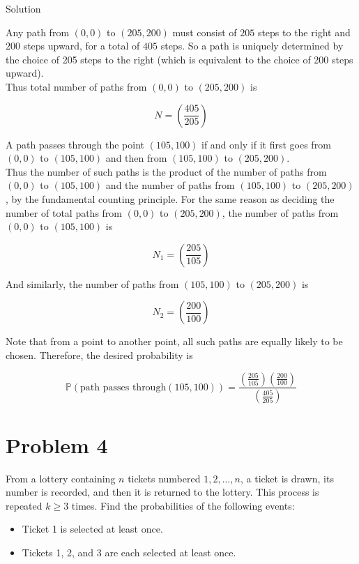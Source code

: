 \documentclass{qlnotes-export}
\begin{document}
\begin{qlsolution}{Solution}

Any path from \((0,0)\) to \((205,200)\) must consist of \(205\) steps to the right and \(200\) steps upward, for a total of \(405\) steps. So a path is uniquely determined by the choice of 205 steps to the right (which is equivalent to the choice of 200 steps upward).\\
Thus total number of paths from \((0,0)\) to \((205,200)\) is

\[N = \left( \frac{405}{205} \right)\]

A path passes through the point \((105,100)\) if and only if it first goes from \((0,0)\) to \((105,100)\) and then from \((105,100)\) to \((205,200)\).\\
Thus the number of such paths is the product of the number of paths from \((0,0)\) to \((105,100)\) and the number of paths from \((105,100)\) to \((205,200)\), by the fundamental counting principle. For the same reason as deciding the number of total paths from \((0,0)\) to \((205,200)\), the number of paths from \((0,0)\) to \((105,100)\) is

\[N_{1} = \left( \frac{205}{105} \right)\]

And similarly, the number of paths from \((105,100)\) to \((205,200)\) is

\[N_{2} = \left( \frac{200}{100} \right)\]

Note that from a point to another point, all such paths are equally likely to be chosen. Therefore, the desired probability is

\[{\mathbb{P}}(\text{path passes through}(105,100)) = \frac{\left( \frac{205}{105} \right)\left( \frac{200}{100} \right)}{\left( \frac{405}{205} \right)}\]

\end{qlsolution}

\section{Problem 4}\label{problem-4-1}

From a lottery containing \(n\) tickets numbered \(1,2,\ldots,n\), a ticket is drawn, its number is recorded, and then it is returned to the lottery. This process is repeated \(k \geq 3\) times. Find the probabilities of the following events:

\begin{itemize}
\item
  Ticket 1 is selected at least once.
\item
  Tickets 1, 2, and 3 are each selected at least once.
\end{itemize}
\end{document}
